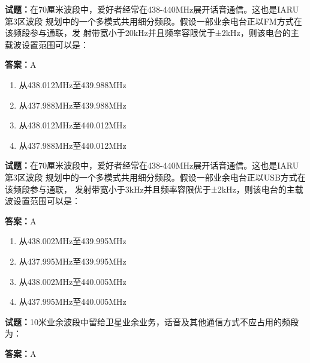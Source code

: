 \documentclass{ctexbook}
\begin{document}
\textbf{试题：}在70厘米波段中，爱好者经常在438-440MHz展开话音通信。这也是IARU第3区波段
规划中的一个多模式共用细分频段。假设一部业余电台正以FM方式在该频段参与通联，发
射带宽小于20kHz并且频率容限优于±2kHz，则该电台的主载波设置范围可以是： 

\textbf{答案：}A 

\begin{enumerate}[leftmargin=3em]
  \item 从438.012MHz至439.988MHz 

  \item 从437.988MHz至439.988MHz 

  \item 从438.012MHz至440.012MHz 

  \item 从437.988MHz至440.012MHz 

\end{enumerate}





\vspace{1em}

\textbf{试题：}在70厘米波段中，爱好者经常在438-440MHz展开话音通信。这也是IARU第3区波段
规划中的一个多模式共用细分频段。假设一部业余电台正以USB方式在该频段参与通联，
发射带宽小于3kHz并且频率容限优于±2kHz，则该电台的主载波设置范围可以是： 

\textbf{答案：}A 

\begin{enumerate}[leftmargin=3em]
  \item 从438.002MHz至439.995MHz 

  \item 从437.995MHz至439.995MHz 

  \item 从438.002MHz至440.005MHz 

  \item 从437.995MHz至440.005MHz 


\end{enumerate}





\vspace{1em}

\textbf{试题：}10米业余波段中留给卫星业余业务，话音及其他通信方式不应占用的频段为： 

\textbf{答案：}A 
\end{document}
